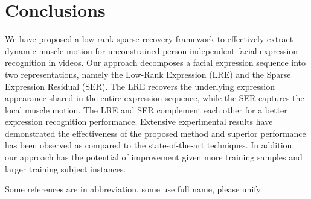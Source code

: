 \documentclass[journal]{IEEEtran}
\begin{document}
\section{Conclusions\label{sec:conclude}}
We have proposed a low-rank sparse recovery framework to effectively extract dynamic muscle motion for unconstrained person-independent facial expression recognition in videos. Our approach decomposes a facial expression sequence into two representations, namely the Low-Rank Expression (LRE) and the Sparse Expression Residual (SER). The LRE recovers the underlying expression appearance shared in the entire expression sequence, while the SER captures the local muscle motion. The LRE and SER complement each other for a better expression recognition performance. Extensive experimental results have demonstrated the effectiveness of the proposed method and superior performance has been observed as compared to the state-of-the-art techniques. In addition, our approach has the potential of improvement given more training samples and larger training subject instances. 

\textcolor[rgb]{1,0,0}{Some references are in abbreviation, some use full name, please unify.}

\ifCLASSOPTIONcaptionsoff
  \newpage
\fi




\end{document}
